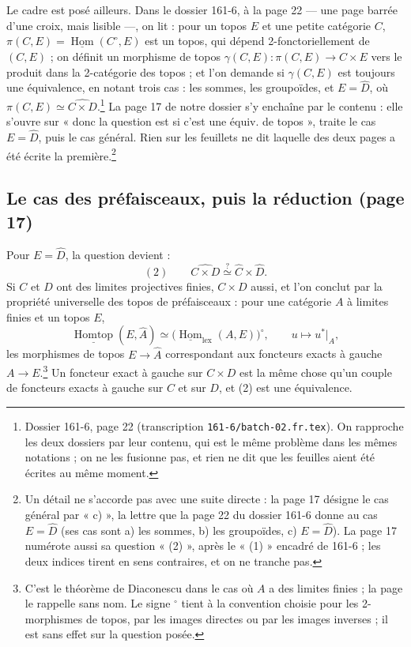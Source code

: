 \documentclass[11pt,a4paper]{article}
\begin{document}
Le cadre est posé ailleurs. Dans le dossier 161-6, à la page 22 --- une page
barrée d'une croix, mais lisible ---, on lit : pour un topos $E$ et une petite
catégorie $C$, $\pi(C, E) = \underline{\operatorname{Hom}}(C^{\circ}, E)$ est un
topos, qui dépend 2-fonctoriellement de $(C, E)$ ; on définit un morphisme de
topos $\gamma(C, E) : \pi(C, E) \to \widehat{C} \times E$ vers le produit dans
la 2-catégorie des topos ; et l'on demande si $\gamma(C, E)$ est toujours une
équivalence, en notant trois cas : les sommes, les groupoïdes, et
$E = \widehat{D}$, où $\pi(C, E) \simeq \widehat{C \times D}$.\footnote{Dossier
161-6, page 22 (transcription \texttt{161-6/batch-02.fr.tex}). On rapproche les
deux dossiers par leur contenu, qui est le même problème dans les mêmes
notations ; on ne les fusionne pas, et rien ne dit que les feuilles aient été
écrites au même moment.} La page 17 de notre dossier s'y enchaîne par le
contenu : elle s'ouvre sur « donc la question est si c'est une équiv. de
topos », traite le cas $E = \widehat{D}$, puis le cas général. Rien sur les
feuillets ne dit laquelle des deux pages a été écrite la première.\footnote{Un
détail ne s'accorde pas avec une suite directe : la page 17 désigne le cas
général par « c) », la lettre que la page 22 du dossier 161-6 donne au cas
$E = \widehat{D}$ (ses cas sont a) les sommes, b) les groupoïdes,
c) $E = \widehat{D}$). La page 17 numérote aussi sa question « (2) », après le
« (1) » encadré de 161-6 ; les deux indices tirent en sens contraires, et on
ne tranche pas.}

\subsection*{Le cas des préfaisceaux, puis la réduction (page 17)}

Pour $E = \widehat{D}$, la question devient :
\[
(2) \qquad \widehat{C \times D} \overset{?}{\simeq} \widehat{C} \times \widehat{D} .
\]
Si $C$ et $D$ ont des limites projectives finies, $C \times D$ aussi, et l'on
conclut par la propriété universelle des topos de préfaisceaux : pour une
catégorie $A$ à limites finies et un topos $E$,
\[
\underline{\operatorname{Homtop}}(E, \widehat{A}) \simeq
\bigl(\underline{\operatorname{Hom}}_{\mathrm{lex}}(A, E)\bigr)^{\circ},
\qquad u \longmapsto u^{*}|_A ,
\]
les morphismes de topos $E \to \widehat{A}$ correspondant aux foncteurs exacts
à gauche $A \to E$.\footnote{C'est le théorème de Diaconescu dans le cas où $A$
a des limites finies ; la page le rappelle sans nom. Le signe ${}^{\circ}$ tient à
la convention choisie pour les 2-morphismes de topos, par les images directes ou
par les images inverses ; il est sans effet sur la question posée.} Un foncteur
exact à gauche sur $C \times D$ est la même chose qu'un couple de foncteurs
exacts à gauche sur $C$ et sur $D$, et (2) est une équivalence.
\end{document}
